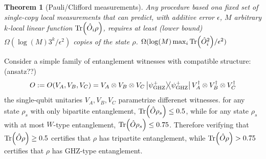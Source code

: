 \documentclass[
aps,
pra,
floatfix,
]{revtex4-2}
\theoremstyle{plain}
\newtheorem{theorem}{Theorem}
\theoremstyle{definition}
\newtheorem{definition}{Definition}
\newcommand{\ghz}{\text{GHZ}}
\newcommand{\shadow}{\textup{shadow}}
\newcommand{\ob}{\hat{O}}
\newcommand{\U}{\hat{U}}
\newcommand{\dm}{\rho}
\begin{document}

\begin{theorem}[Pauli/Clifford measurements]\label{thm:classical_shadow_lower}
	Any procedure based ona fixed set of single-copy local measurements that can predict,
	with additive error $\epsilon$, $M$ arbitrary $k$-local linear function $\Tr(\ob_i\dm)$,
	requires at least (lower bound)
	$\Omega(\log(M) 3^k/\epsilon^2)$ copies of the state $\dm$.
	$\Omega(\log(M) \max_i\Tr(\ob_i^2)/\epsilon^2)$ 
\end{theorem}
Consider a simple family of entanglement witnesses with compatible structure:  (ansatz??)
\begin{equation}
	O:= O(V_A,V_B,V_C)=V_A\otimes V_B \otimes V_C \op{\psi_{\ghz}^+} V_A^\dagger\otimes V_B^\dagger \otimes V_C^\dagger
\end{equation}
the single-qubit unitaries $V_A,V_B,V_C$ parametrize differenet witnesses.
for any state $\dm_s$ with only bipartite entanglement, $\Tr(\ob \dm_s)\le 0.5$, 
while for any state $\dm_s$ with at most $W$-type entanglement, $\Tr(\ob \dm_s)\le 0.75$.
Therefore verifying that $\Tr(\ob \dm)\ge 0.5$ certifies that $\dm$ has tripartite entanglement, while $\Tr(\ob \dm)> 0.75$ certifies that $\dm$ has $\ghz$-type entanglement.
\end{document}
